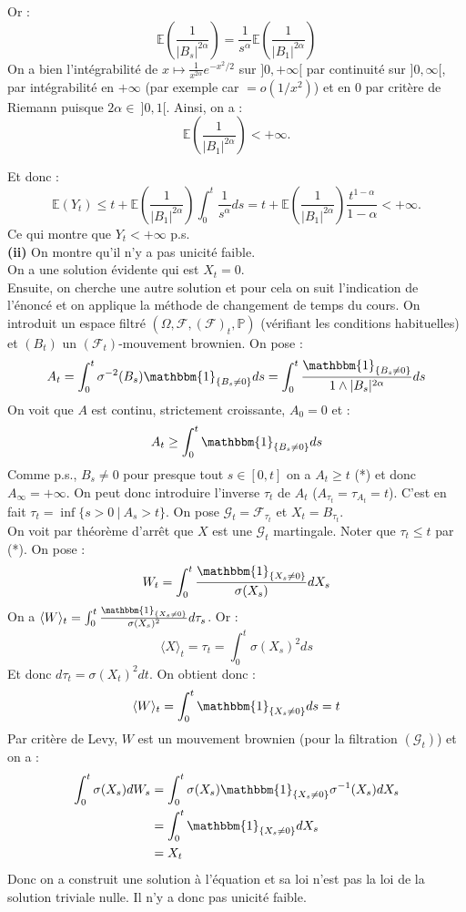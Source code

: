\documentclass[a4paper,12pt]{article}
\newcommand{\E}{\mathbb{E}}
\newcommand{\prob}{\mathbb{P}}
\newcommand{\ind}{\mathbbm{1}}
\newcommand{\f}{\mathcal{F}}
\begin{document}
Or :
\[
\E \left( \frac{1}{|B_s|^{2 \alpha}} \right) = \frac{1}{s^{\alpha}} \E \left( \frac{1}{|B_1|^{2\alpha}} \right)
\]
On a bien l'intégrabilité de $x \mapsto \frac{1}{x^{2 \alpha }} e^{-x^2 /2}$ sur $]0, + \infty[$ par continuité sur $]0, \infty[$, par intégrabilité en $+\infty$ (par exemple car $=o(1/x^2)$) et en $0$ par critère de Riemann puisque $2\alpha \in \ ]0,1[$. Ainsi, on a :
\[
\E \left( \frac{1}{|B_1|^{2 \alpha}} \right) < + \infty.
\]

Et donc :
\[
\E (Y_t) \leq t + \E \left( \frac{1}{|B_1|^{2 \alpha}} \right) \int_0^t \frac{1}{s^{\alpha}} ds = t + \E \left( \frac{1}{|B_1|^{2 \alpha}} \right) \frac{t^{1- \alpha}}{1-\alpha} < + \infty.
\]
Ce qui montre que $Y_t < + \infty$ p.s. \\

\textbf{(ii)} On montre qu'il n'y a pas unicité faible. \\
On a une solution évidente qui est $X_t=0$. \\

Ensuite, on cherche une autre solution et pour cela on suit l'indication de l'énoncé et on applique la méthode de changement de temps du cours. On introduit un espace filtré $(\Omega, \f, (\f)_t, \prob)$ (vérifiant les conditions habituelles) et $(B_t)$ un $(\f_t)$-mouvement brownien. On pose :
$$A_t = \int_0^t \sigma^{-2} (B_s) \ind_{\{ B_s \neq 0 \}} ds = \int_0^t \frac{\ind_{\{ B_s \neq 0 \}}}{1 \wedge |B_s|^{2 \alpha}} ds$$
On voit que $A$ est continu, strictement croissante, $A_0=0$ et :
$$A_t \geq \int_0^t \ind_{\{ B_s \neq 0 \}} ds$$
Comme p.s., $B_s \neq 0$ pour presque tout $s \in [0,t]$ on a $A_t \geq t$ (*) et donc $A_{\infty}=+\infty$. On peut donc introduire l'inverse $\tau_t$ de $A_t$ ($A_{\tau_t} = \tau_{A_t}=t$). C'est en fait $\tau_t = \inf \{ s > 0 \ | \ A_s > t \}$. On pose $\mathcal{G}_t = \f_{\tau_t}$ et $X_t=B_{\tau_t}$. \\

On voit par théorème d'arrêt que $X$ est une $\mathcal{G}_t$ martingale. Noter que $\tau_t \leq t$ par (*). On pose :
$$W_t = \int_0^t \frac{\ind_{\{ X_s \neq 0 \}}}{\sigma (X_s)} dX_s$$ 
On a $\langle W \rangle_t = \int_0^t \frac{\ind_{\{ X_s \neq 0 \}}}{\sigma (X_s)^2} d \tau_s$. Or :
$$\langle X \rangle_t = \tau_t = \int_0^t \sigma(X_s)^2 ds$$
Et donc $d \tau_t = \sigma (X_t)^2 dt$. On obtient donc :
$$\langle W \rangle_t = \int_0^t \ind_{\{ X_s \neq 0 \}} ds = t$$
Par critère de Levy, $W$ est un mouvement brownien (pour la filtration $(\mathcal{G}_t)$) et on a :
\begin{align*}
\int_0^t \sigma (X_s) dW_s & = \int_0^t \sigma (X_s) \ind_{\{ X_s \neq 0 \}} \sigma^{-1} (X_s) dX_s \\
& = \int_0^t \ind_{\{ X_s \neq 0 \}} dX_s \\
& = X_t
\end{align*}
Donc on a construit une solution à l'équation et sa loi n'est pas la loi de la solution triviale nulle. Il n'y a donc pas unicité faible. \\
\end{document}
